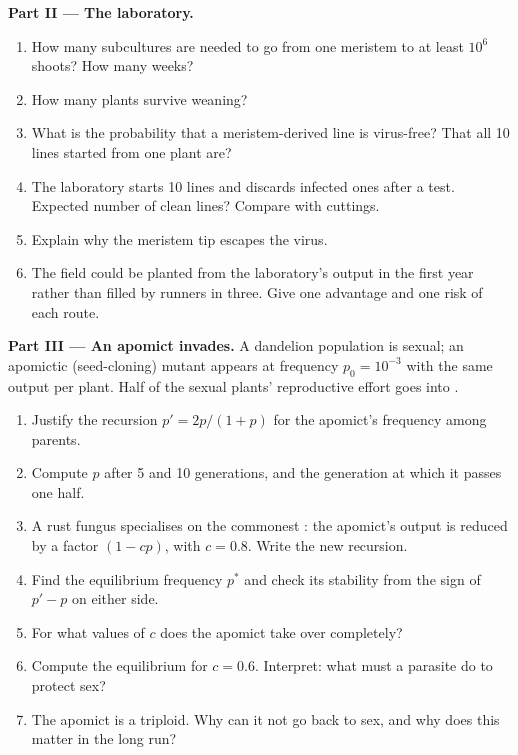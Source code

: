 \begin{problem}
\medskip
\noindent\textbf{Part II --- The laboratory.}
\begin{enumerate}[resume]
  \item How many subcultures are needed to go from one meristem to at
        least $10^{6}$ shoots? How many weeks?
  \item How many plants survive weaning?
  \item What is the probability that a meristem-derived line is
        virus-free? That all \num{10} lines started from one plant
        are?
  \item The laboratory starts \num{10} lines and discards infected
        ones after a test. Expected number of clean lines? Compare
        with cuttings.
  \item Explain why the meristem tip escapes the virus.
  \item The field could be planted from the laboratory's output in
        the first year rather than filled by runners in three. Give
        one advantage and one risk of each route.
\end{enumerate}

\medskip
\noindent\textbf{Part III --- An apomict invades.}
A dandelion population is sexual; an apomictic (seed-cloning) mutant
appears at frequency $p_0 = 10^{-3}$ with the same  output per
plant. Half of the sexual plants' reproductive effort goes into
.
\begin{enumerate}[resume]
  \item Justify the recursion $p' = 2p/(1 + p)$ for the apomict's
        frequency among  parents.
  \item Compute $p$ after 5 and 10 generations, and the generation at
        which it passes one half.
  \item A rust fungus specialises on the commonest : the
        apomict's  output is reduced by a factor $(1 - cp)$, with
        $c = 0.8$. Write the new recursion.
  \item Find the equilibrium frequency $p^*$ and check its stability
        from the sign of $p' - p$ on either side.
  \item For what values of $c$ does the apomict take over completely?
  \item Compute the equilibrium for $c = 0.6$. Interpret: what must a
        parasite do to protect sex?
  \item The apomict is a triploid. Why can it not go back to sex, and
        why does this matter in the long run?
\end{enumerate}


\end{problem}
